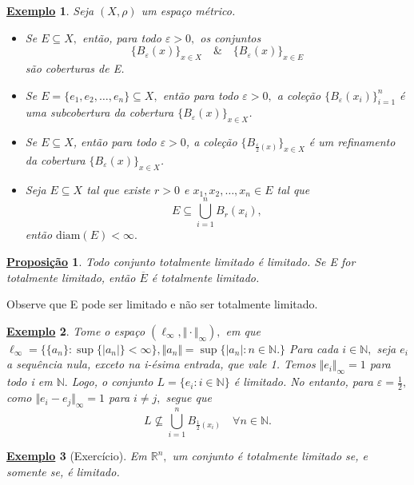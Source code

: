 \documentclass{article}
\newtheorem*{prop*}{\underline{Proposi\c c\~ao}}
\newtheorem{example}{\underline{Exemplo}}
\begin{document}
\begin{example}
  Seja \((X, \rho )\) um espaço métrico.
\begin{itemize}
  \item[1)] Se \(E\subseteq{X},\) então, para todo \(\varepsilon >0,\) os conjuntos 
  \[
    \{B_{\varepsilon }(x)\}_{x\in X}\quad\&\quad \{B_{\varepsilon }(x)\}_{x\in E}
  \]
são coberturas de E.
  \item[2)] Se \(E = \{e_{1}, e_{2}, \dotsc, e_{n}\}\subseteq{X},\) então para todo \(\varepsilon >0,\) a coleção \(\{B_{\varepsilon }(x_{i})\}_{i=1}^{n}\) é uma subcobertura
da cobertura \(\{B_{\varepsilon }(x)\}_{x\in X}\).
\item[3)] Se \(E\subseteq{X}\), então para todo \(\varepsilon >0\), a coleção \(\{B_{\frac{\varepsilon }{2}(x)}\}_{x\in X}\) é um refinamento da cobertura \(\{B_{\varepsilon }(x)\}_{x\in X}\).
\item[4)] Seja \(E\subseteq{X}\) tal que existe \(r > 0\) e \(x_{1}, x_{2}, \dotsc, x_{n}\in E\) tal que 
  \[
    E\subseteq{\bigcup_{i=1}^{n}{B_{r}(x_{i})}},
  \]
  então \(\mathrm{diam}(E) < \infty.\)
\end{itemize}
\end{example}
\begin{prop*}
  Todo conjunto totalmente limitado é limitado. Se E for totalmente limitado, então \(\overline{E}\) é totalmente limitado.
\end{prop*}
 Observe que E pode ser limitado e não ser totalmente limitado.
\begin{example}
  Tome o espaço \((\ell_{\infty}, \Vert \cdot  \Vert_{\infty}),\) em que \(\ell_{\infty}=\{\{a_{n}\}: \sup\{|a_{n}|\} < \infty\}, \Vert a_{n} \Vert = \sup\{|a_{n}|:n\in \mathbb{N}.\}\)
Para cada \(i\in \mathbb{N},\) seja \(e_{i}\) a sequência nula, exceto na i-ésima entrada, que vale 1. Temos \(\Vert e_{i} \Vert_{\infty} = 1\) para todo i em \(\mathbb{N}.\) Logo,
o conjunto \(L = \{e_{i}:i\in \mathbb{N}\}\) é limitado. No entanto, para \(\varepsilon = \frac{1}{2},\) como \(\Vert e_{i}-e_{j} \Vert_{\infty} = 1\) para \(i\neq j,\)
segue que 
  \[
    L\not\subseteq{\bigcup_{i=1}^{n}{B_{\frac{1}{2}(x_{i})}}}\quad \forall n\in \mathbb{N}.
  \]
\end{example}
\begin{example}[Exercício]
  Em \(\mathbb{R}^{n},\) um conjunto é totalmente limitado se, e somente se, é limitado.
\end{example}
\end{document}
